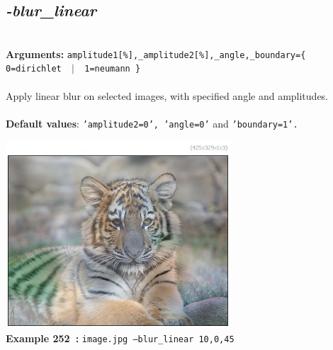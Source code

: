 \documentclass[a4paper,11pt,twoside]{book}
\begin{document}
\subsection{\emph{-blur\_linear} }\vspace*{-0.5em}
~\\\textbf{Arguments: } 
{\small \texttt{amplitude1[\%],\_amplitude2[\%],\_angle,\_boundary=\{ 0=dirichlet ~$|$~ 1=neumann \}}}\\~\\
Apply linear blur on selected images, with specified angle and amplitudes.
~\\~\\\textbf{Default values}: {\small \texttt{'amplitude2=0', 'angle=0'} and \texttt{'boundary=1'.}}
\begin{center}\includegraphics[keepaspectratio=true,height=7cm,width=\textwidth]{img/gmic_def252.jpg}\\
{\footnotesize \textbf{Example 252~:} \texttt{image.jpg --blur\_linear 10,0,45}}
\end{center}
\end{document}
